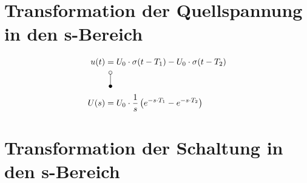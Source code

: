 \documentclass[11pt]{scrartcl}
\begin{document}
\setlength{\jot}{10pt}


\section{Transformation der Quellspannung in den s-Bereich}
\begin{align}
  \begin{split}
  u(t) &= U_{0} \cdot \sigma(t-T_{1}) - U_{0} \cdot \sigma(t-T_{2}) \\
  &\vLaplace \\
  U(s) &= U_{0} \cdot \frac{1}{s} \left( e^{-s \cdot T_{1}} - e^{-s \cdot T_{2}}\right)
  \end{split}
\end{align}

\section{Transformation der Schaltung in den s-Bereich}
\end{document}
